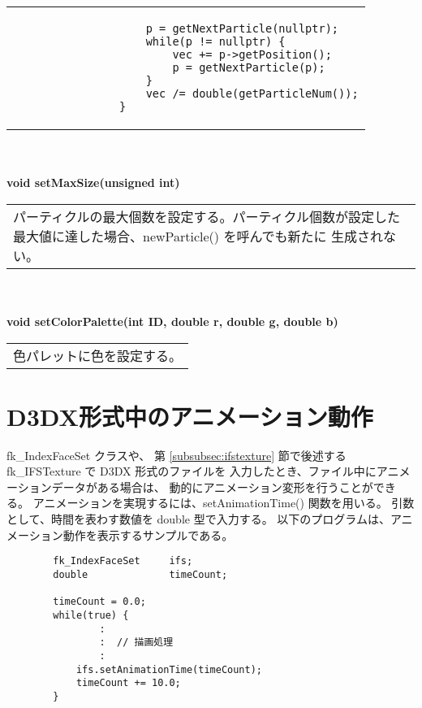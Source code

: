 \begin{tabbing}
\begin{tabular}{p{15cm}}
\begin{screen}
\begin{verbatim}
		            p = getNextParticle(nullptr);
		            while(p != nullptr) {
		                vec += p->getPosition();
		                p = getNextParticle(p);
		            }
		            vec /= double(getParticleNum());
		        }
		\end{verbatim}
		\end{screen}
	\end{tabular} \\ \\

\> \textbf{void setMaxSize(unsigned int)} \\
	\> \> \begin{tabular}{p{15cm}}
		パーティクルの最大個数を設定する。パーティクル個数が設定した
		最大値に達した場合、newParticle() を呼んでも新たに
		生成されない。
	\end{tabular} \\ \\

\> \textbf{void setColorPalette(int ID, double r, double g, double b)} \\
	\> \> \begin{tabular}{p{15cm}}
		色パレットに色を設定する。
	\end{tabular}
\end{tabbing}

\section{D3DX形式中のアニメーション動作} \label{subsubsec:d3dxanimation}
fk\_IndexFaceSet クラスや、
第 \ref{subsubsec:ifstexture} 節で後述する
fk\_IFSTexture で D3DX 形式のファイルを
入力したとき、ファイル中にアニメーションデータがある場合は、
動的にアニメーション変形を行うことができる。
アニメーションを実現するには、setAnimationTime() 関数を用いる。
引数として、時間を表わす数値を double 型で入力する。
以下のプログラムは、アニメーション動作を表示するサンプルである。
\\
\begin{breakbox}
\begin{verbatim}
        fk_IndexFaceSet     ifs;
        double              timeCount;
        
        timeCount = 0.0;
        while(true) {
                :
                :  // 描画処理
                :
            ifs.setAnimationTime(timeCount);
            timeCount += 10.0;
        }
\end{verbatim}
\end{breakbox} ~

